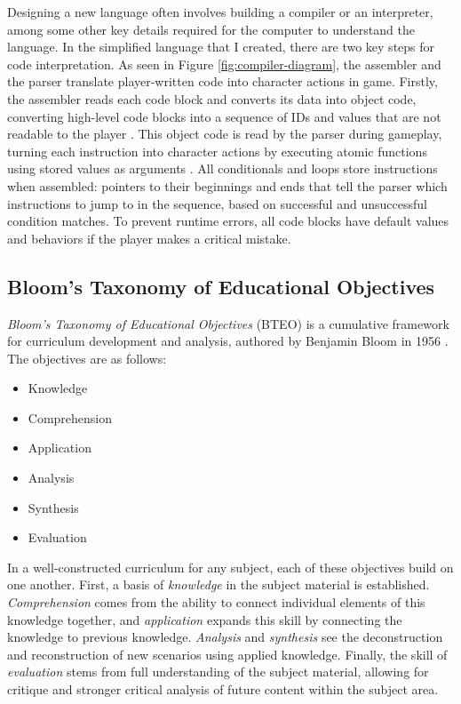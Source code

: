 \documentclass[10pt,twocolumn]{article}
\begin{document}
Designing a new language often involves building a compiler or an interpreter, among some other key details required for the computer to understand the language. In the simplified language that I created, there are two key steps for code interpretation. As seen in Figure \ref{fig:compiler-diagram}, the assembler and the parser translate player-written code into character actions in game. Firstly, the assembler reads each code block and converts its data into object code, converting high-level code blocks into a sequence of IDs and values that are not readable to the player \cite{assembly-textbook}. This object code is read by the parser during gameplay, turning each instruction into character actions by executing atomic functions using stored values as arguments \cite{compiler-textbook}. All conditionals and loops store instructions when assembled: pointers to their beginnings and ends that tell the parser which instructions to jump to in the sequence, based on successful and unsuccessful condition matches. To prevent runtime errors, all code blocks have default values and behaviors if the player makes a critical mistake.

\subsection{Bloom's Taxonomy of Educational Objectives}
\textit{Bloom’s Taxonomy of Educational Objectives} (BTEO) is a cumulative framework for curriculum development and analysis, authored by Benjamin Bloom in 1956 \cite{bloom-taxonomy}. The objectives are as follows:

\begin{itemize}
    \item Knowledge
    \item Comprehension
    \item Application
    \item Analysis
    \item Synthesis
    \item Evaluation
\end{itemize}

In a well-constructed curriculum for any subject, each of these objectives build on one another. First, a basis of \textit{knowledge} in the subject material is established. \textit{Comprehension} comes from the ability to connect individual elements of this knowledge together, and \textit{application} expands this skill by connecting the knowledge to previous knowledge. \textit{Analysis} and \textit{synthesis} see the deconstruction and reconstruction of new scenarios using applied knowledge. Finally, the skill of \textit{evaluation} stems from full understanding of the subject material, allowing for critique and stronger critical analysis of future content within the subject area. 
\end{document}
